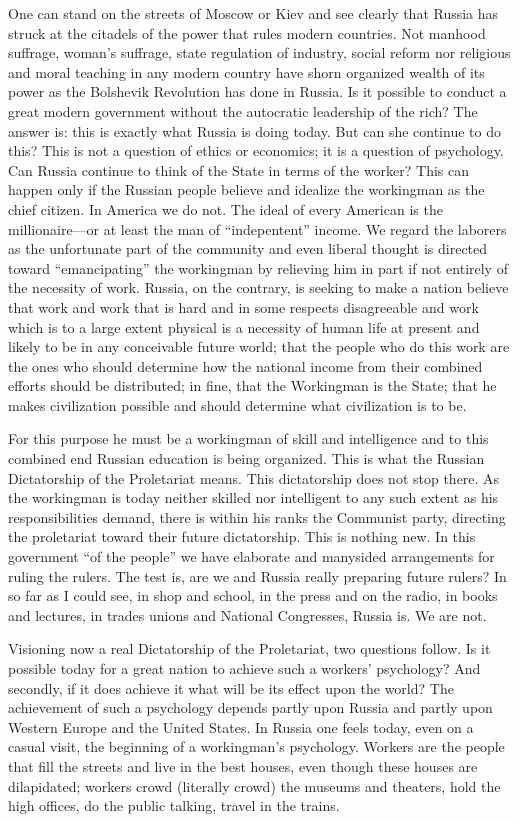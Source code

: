 \documentclass[letterpaper,10pt,english]{jupyterBook}
\begin{document}
\sphinxAtStartPar
One can stand on the streets of Moscow or Kiev and see clearly that Russia has struck at the citadels of the power that  rules modern countries. Not manhood suffrage, woman’s suffrage, state regulation of industry, social reform nor religious and moral teaching in any modern country have shorn organized wealth of its power as the Bolshevik Revolution has done in Russia. Is it possible to conduct a great modern government without the autocratic leadership of the rich? The answer is: this is exactly what Russia is doing today. But can she continue to do this? This is not a question of ethics or economics; it is a question of psychology. Can Russia continue to think of the State in terms of the worker? This can happen only if the Russian people believe and idealize the workingman as the chief citizen. In America we do not. The ideal of every American is the millionaire—or at least the man of “indepentent” income. We regard the laborers as the unfortunate part of the community and even liberal thought is directed toward “emancipating” the workingman by relieving him in part if not entirely of the necessity of work. Russia, on the contrary, is seeking to make a nation believe that work and work that is hard and in some respects disagreeable and work which is to a large extent physical is a necessity of human life at present and likely to be in any conceivable future world; that the people who do this work are the ones who should determine how the national income from their combined efforts should be distributed; in fine, that the Workingman is the State; that he makes civilization possible and should determine what civilization is to be.

\sphinxAtStartPar
For this purpose he must be a workingman of skill and intelligence and to this combined end Russian education is being organized. This is what the Russian Dictatorship of the Proletariat means. This dictatorship does not stop there. As the workingman is today neither skilled nor intelligent to any such extent as his responsibilities demand, there is within his ranks the Communist party, directing the proletariat toward their future dictatorship. This is nothing new. In this government “of the people” we have elaborate and many\sphinxhyphen{}sided arrangements for ruling the rulers. The test is, are we and Russia really preparing future rulers? In so far as I could see, in shop and school, in the press and on the radio, in books and lectures, in trades unions and National Congresses, Russia is. We are not.

\sphinxAtStartPar
Visioning now a real Dictatorship of the Proletariat, two questions follow. Is it possible today for a great nation to achieve such a workers’ psychology? And secondly, if it does achieve it what will be its effect upon the world? The achievement of such a psychology depends partly upon Russia and partly upon Western Europe and the United States. In Russia one feels today, even on a casual visit, the beginning of a workingman’s psychology. Workers are the people that fill the streets and live in the best houses, even though these houses are dilapidated; workers crowd (literally crowd) the museums and theaters, hold the high offices, do the public talking, travel in the trains.
\end{document}
